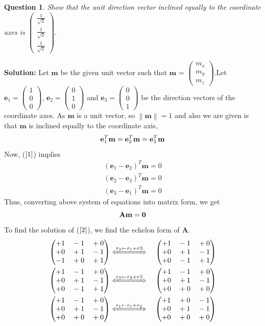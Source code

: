 \documentclass{article}
\newcommand{\solution}{\noindent \textbf{Solution: }}
\newtheorem{question}[theorem]{Question}
\newcommand{\myvec}[1]{\ensuremath{\begin{pmatrix}#1\end{pmatrix}}}
\newcommand{\norm}[1]{\left\lVert#1\right\rVert}
\let\vec\mathbf
\begin{document}
\begin{question}
	Show that the unit direction vector inclined equally to the coordinate axes is $\myvec{\frac{1}{\sqrt{3}} \\ \frac{1}{\sqrt{3}} \\ \frac{1}{\sqrt{3}}}$.
\end{question}
\solution Let $\vec{m}$ be the given unit vector such that $\vec{m}$ = $\myvec{m_x \\ m_y \\ m_z}$.Let $\vec{e}_1=\myvec{1 \\ 0 \\ 0}$, $\vec{e}_2=\myvec{0 \\ 1 \\ 0}$ and $\vec{e}_3=\myvec{0 \\ 0 \\ 1}$ be the direction vectors of the coordinate axes.
As $\vec{m}$ is a unit vector, so $\norm{\vec{m}} =1$ and also we are given is that $\vec{m}$ is inclined equally to the coordinate axis, 
\begin{equation}{\label{1}}
\vec{e}_1^T\vec{m} =\vec{e}_2^T\vec{m}=\vec{e}_3^T\vec{m}
\end{equation}
Now, ($\ref{1}$) implies 
\begin{align}
	(\vec{e}_1 -\vec{e}_2)^T\vec{m} = 0 \\
	(\vec{e}_2 -\vec{e}_3)^T\vec{m} = 0 \\
	(\vec{e}_3 -\vec{e}_1)^T\vec{m} = 0
\end{align}
Thus, converting above system of equations into matrix form, we get
\begin{equation}{\label{2}}
\vec{Am = 0 }
\end{equation}
To find the solution of ($\ref{2}$), we find the  echelon form of  $\vec{A}$.
\begin{align}
& \myvec{+1 \quad  -1 \quad +0 \\ +0 \quad +1 \quad -1 \\ -1 \quad +0 \quad +1 } \xLeftrightarrow[]{r_3 \leftarrow r_1 + r3} \quad \myvec{+1 \quad  -1 \quad +0 \\ +0 \quad +1 \quad -1 \\ +0 \quad -1 \quad +1 } \\
& \myvec{+1 \quad  -1 \quad +0 \\ +0 \quad +1 \quad -1 \\ +0 \quad -1 \quad +1 } \xLeftrightarrow[]{r_3 \leftarrow r_2 + r3} \quad \myvec{+1 \quad  -1 \quad +0 \\ +0 \quad +1 \quad -1 \\ +0 \quad +0 \quad +0 } \\
& \myvec{+1 \quad  -1 \quad +0 \\ +0 \quad +1 \quad -1 \\ +0 \quad +0 \quad +0 } \xLeftrightarrow[]{r_1\leftarrow r_1+r_2} \quad  \myvec{+1 \quad  +0 \quad -1 \\ +0 \quad +1 \quad -1 \\ +0 \quad +0 \quad +0 }{\label{3}}
\end{align}
\end{document}
